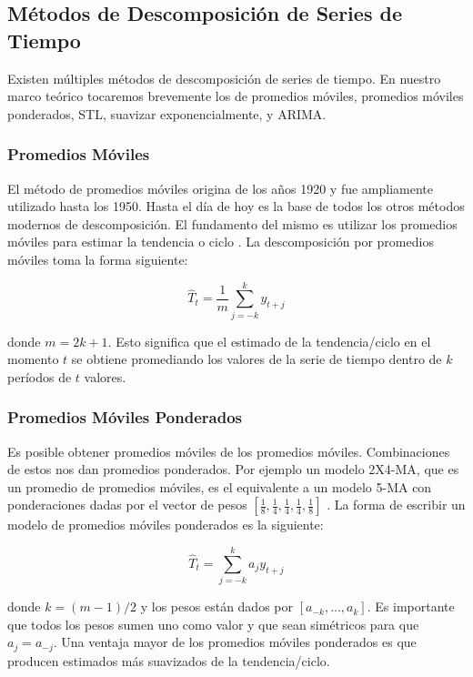 \subsection{Métodos de Descomposición de Series de Tiempo}
Existen múltiples métodos de descomposición de series de tiempo. En nuestro marco teórico tocaremos brevemente los de promedios móviles, promedios móviles ponderados, STL, suavizar exponencialmente, y ARIMA.

\subsubsection{Promedios Móviles}

El método de promedios móviles origina de los años 1920 y fue ampliamente utilizado hasta los 1950. Hasta el día de hoy es la base de todos los otros métodos modernos de descomposición. El fundamento del mismo es utilizar los promedios móviles para estimar la tendencia o ciclo \cite{hyndman}. La descomposición por promedios móviles toma la forma siguiente:

\[ \hat{T}_{t} = \frac{1}{m} \sum_{j = -k}^{k} y_{t + j}  \]

donde $m=2k+1$. Esto significa que el estimado de la tendencia/ciclo en el momento $t$ se obtiene promediando los valores de la serie de tiempo dentro de $k$ períodos de $t$ valores.

\subsubsection{Promedios Móviles Ponderados}
Es posible obtener promedios móviles de los promedios móviles. Combinaciones de estos nos dan promedios ponderados. Por ejemplo un modelo 2X4-MA, que es un promedio de promedios móviles, es el equivalente a un modelo 5-MA con ponderaciones dadas por el vector de pesos $[\frac{1}{8}, \frac{1}{4}, \frac{1}{4}, \frac{1}{4}, \frac{1}{8}]$ \cite{hyndman}. La forma de escribir un modelo de promedios móviles ponderados es la siguiente:

\[ \hat{T}_{t} = \sum_{j = -k}^{k} a_j y_{t + j}  \]

donde $k=(m-1)/2$ y los pesos están dados por $[a_{-k}, \ldots, a_{k}]$. Es importante que todos los pesos sumen uno como valor y que sean simétricos para que $a_{j} = a_{-j}$. Una ventaja mayor de los promedios móviles ponderados es que producen estimados más suavizados de la tendencia/ciclo.

